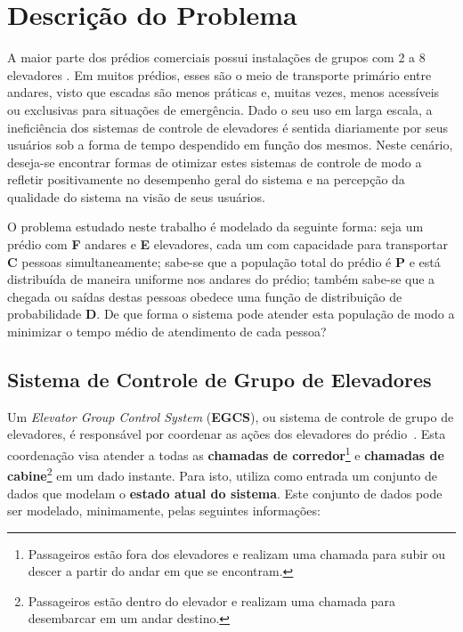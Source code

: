 \chapter{\label{chap:problem}Descrição do Problema}

A maior parte dos prédios comerciais possui instalações de grupos com 2 a 8
elevadores \cite{KOEHLEROTTIGER02}. Em muitos prédios, esses são o meio de
transporte primário entre andares, visto que escadas são menos práticas e,
muitas vezes, menos acessíveis ou exclusivas para situações de emergência. Dado
o seu uso em larga escala, a ineficiência dos sistemas de controle de elevadores
é sentida diariamente por seus usuários sob a forma de tempo despendido em
função dos mesmos. Neste cenário, deseja-se encontrar formas de otimizar estes
sistemas de controle de modo a refletir positivamente no desempenho geral do
sistema e na percepção da qualidade do sistema na visão de seus usuários.

O problema estudado neste trabalho é modelado da seguinte forma: seja um prédio
com \textbf{F} andares e \textbf{E} elevadores, cada um com capacidade para
transportar \textbf{C} pessoas simultaneamente; sabe-se que a população total do
prédio é \textbf{P} e está distribuída de maneira uniforme nos andares do
prédio; também sabe-se que a chegada ou saídas destas pessoas obedece uma função
de distribuição de probabilidade \textbf{D}. De que forma o sistema pode atender
esta população de modo a minimizar o tempo médio de atendimento de cada pessoa?

\section{\label{section:egcs}Sistema de Controle de Grupo de Elevadores}

Um \textit{Elevator Group Control System} (\textbf{EGCS}), ou sistema de
controle de grupo de elevadores, é responsável por coordenar as ações dos
elevadores do prédio~\cite{kuzunuki1984elevator}. Esta coordenação visa atender
a todas as \textbf{chamadas de corredor}\footnote{Passageiros estão fora dos
elevadores e realizam uma chamada para subir ou descer a partir do andar em que
se encontram.} e \textbf{chamadas de cabine}\footnote{Passageiros estão dentro
do elevador e realizam uma chamada para desembarcar em um andar destino.} em um
dado instante. Para isto, utiliza como entrada um conjunto de dados que modelam
o \textbf{estado atual do sistema}. Este conjunto de dados pode ser modelado,
minimamente, pelas seguintes informações:

